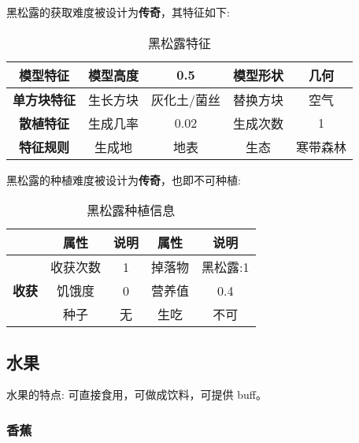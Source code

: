 黑松露的获取难度被设计为\textbf{传奇}，其特征如下:
\begin{table}[H]
    \centering
    \caption{黑松露特征}
    \label{table:黑松露特征}
    \setlength{\tabcolsep}{4mm}
    \begin{tabular}{c|cc|cc}
        \toprule
        \textbf{模型特征}   & 模型高度 & 0.5      & 模型形状 & 几何     \\
        \midrule
        \textbf{单方块特征} & 生长方块 & 灰化土/菌丝 & 替换方块 & 空气     \\
        \midrule
        \textbf{散植特征}   & 生成几率 & 0.02   & 生成次数 & 1        \\
        \midrule
        \textbf{特征规则}   & 生成地   & 地表   & 生态     & 寒带森林 \\
        \bottomrule
    \end{tabular}
\end{table}


黑松露的种植难度被设计为\textbf{传奇}，也即不可种植:

\begin{table}[H]
    \centering
    \caption{黑松露种植信息}
    \label{table:黑松露种植信息}
    \setlength{\tabcolsep}{4mm}
    \begin{tabular}{c|cc|cc}
        \toprule
                                           & \textbf{属性} & \textbf{说明} & \textbf{属性} & \textbf{说明} \\
        \midrule
        \multirow{3}{*}{\textbf{收获}}     & 收获次数      & 1             & 掉落物        & 黑松露:1      \\
                                           & 饥饿度        & 0             & 营养值        & 0.4           \\
                                           & 种子          & 无  & 生吃          & 不可   \\
        \bottomrule
    \end{tabular}
\end{table}

\subsection{水果}

水果的特点: 可直接食用，可做成饮料，可提供 buff。

\subsubsection{香蕉}

